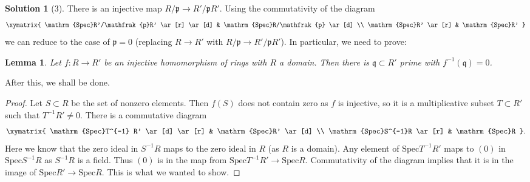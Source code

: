 \documentclass{article}
\newtheorem{lemma}{Lemma}
\theoremstyle{definition}
\newtheorem*{solution}{Solution}
\begin{document}
\newcommand{\spec}{\mathrm{Spec}}
\begin{solution}[3]
There is an injective map $R/\mathfrak{p} \to R'/\mathfrak{p} R'$. Using the
commutativity of the diagram
\[ \xymatrix{
\spec R'/\mathfrak{p}R' \ar[r] \ar[d]  &  \spec R/\mathfrak{p} \ar[d]  \\
\spec R' \ar[r] &  \spec R'
}\]
we can reduce to the case of $\mathfrak{p}=0$ (replacing $R \to R'$ with
$R/\mathfrak{p} \to R'/\mathfrak{p}R'$).
In particular, we need to prove:

\begin{lemma} 
Let $f: R \to R'$ be an injective homomorphism of rings with $R$ a domain. Then there is
$\mathfrak{q} \subset R'$ prime with $f^{-1}(\mathfrak{q})=0$.
\end{lemma} 
After this, we shall be done. 
\begin{proof} 
Let $S \subset R$ be the set of nonzero elements. Then $f(S)$ does not contain
zero as $f$ is injective, so it is a multiplicative subset $T \subset R'$ such that
$T^{-1}R' \neq 0$. There is a
commutative diagram
\[ 
\xymatrix{
\spec T^{-1} R' \ar[d]  \ar[r] &  \spec R' \ar[d]  \\
\spec S^{-1}R \ar[r] & \spec R
}
.\]
Here we know that the zero ideal in $S^{-1}R$ maps to the zero ideal in $R$ (as
$R$ is a domain). Any element of $\spec T^{-1}R'$ maps to $(0)$ in $\spec
S^{-1}R$ as $S^{-1}R$ is a field. Thus $(0)$ is in the map from $\spec T^{-1}R'
\to \spec R$. Commutativity of the diagram implies that it is in the image of
$\spec R' \to \spec R$. This is what we wanted to show.
\end{proof} 
\end{solution}
\end{document}
